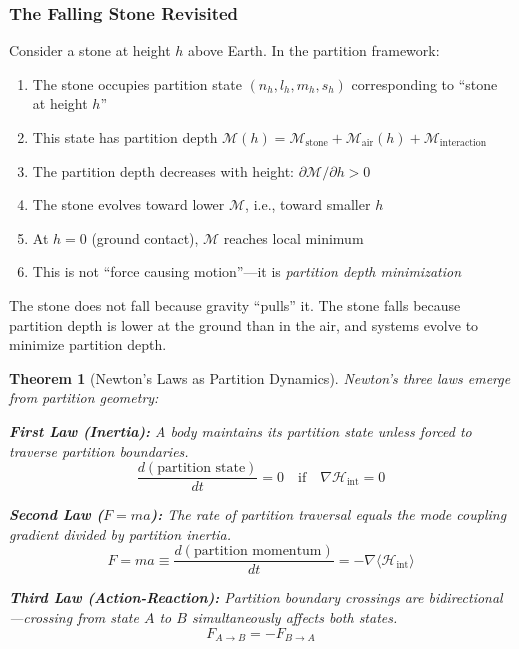 \documentclass[twocolumn,10pt,a4paper]{article}
\newtheorem{theorem}{Theorem}[section]
\theoremstyle{definition}
\theoremstyle{remark}
\newcommand{\Depth}{\mathcal{M}}
\begin{document}
\subsubsection{The Falling Stone Revisited}

Consider a stone at height $h$ above Earth. In the partition framework:

\begin{enumerate}
    \item The stone occupies partition state $(n_h, l_h, m_h, s_h)$ corresponding to ``stone at height $h$''

    \item This state has partition depth $\Depth(h) = \Depth_{\text{stone}} + \Depth_{\text{air}}(h) + \Depth_{\text{interaction}}$

    \item The partition depth decreases with height: $\partial \Depth / \partial h > 0$

    \item The stone evolves toward lower $\Depth$, i.e., toward smaller $h$

    \item At $h = 0$ (ground contact), $\Depth$ reaches local minimum

    \item This is not ``force causing motion''---it is \emph{partition depth minimization}
\end{enumerate}

The stone does not fall because gravity ``pulls'' it. The stone falls because partition depth is lower at the ground than in the air, and systems evolve to minimize partition depth.

\begin{theorem}[Newton's Laws as Partition Dynamics]
\label{thm:newton}
Newton's three laws emerge from partition geometry:

\textbf{First Law (Inertia):} A body maintains its partition state unless forced to traverse partition boundaries.
\begin{equation}
    \frac{d(\text{partition state})}{dt} = 0 \quad \text{if} \quad \nabla \mathcal{H}_{\text{int}} = 0
\end{equation}

\textbf{Second Law ($F = ma$):} The rate of partition traversal equals the mode coupling gradient divided by partition inertia.
\begin{equation}
    F = ma \equiv \frac{d(\text{partition momentum})}{dt} = -\nabla \langle \mathcal{H}_{\text{int}} \rangle
\end{equation}

\textbf{Third Law (Action-Reaction):} Partition boundary crossings are bidirectional---crossing from state $A$ to $B$ simultaneously affects both states.
\begin{equation}
    F_{A \to B} = -F_{B \to A}
\end{equation}
\end{theorem}
\end{document}
